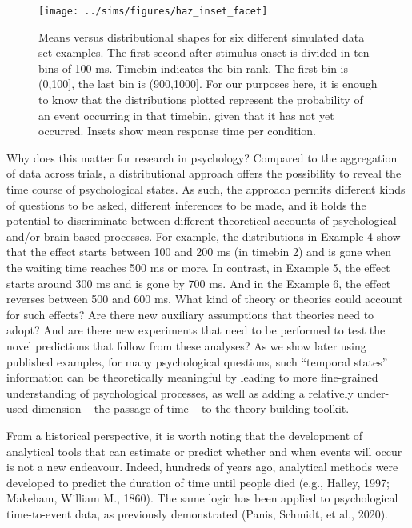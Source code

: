 \documentclass[
  man, donotrepeattitle,floatsintext]{apa6}
\begin{document}
\begin{figure}[H]

{\centering \texttt{[image: ../sims/figures/haz\_inset\_facet]} 

}

\caption{Means versus distributional shapes for six different simulated data set examples. The first second after stimulus onset is divided in ten bins of 100 ms. Timebin indicates the bin rank. The first bin is (0,100{]}, the last bin is (900,1000{]}. For our purposes here, it is enough to know that the distributions plotted represent the probability of an event occurring in that timebin, given that it has not yet occurred. Insets show mean response time per condition.}\label{fig:plot1}
\end{figure}

Why does this matter for research in psychology? Compared to the aggregation of data across trials, a distributional approach offers the possibility to reveal the time course of psychological states. As such, the approach permits different kinds of questions to be asked, different inferences to be made, and it holds the potential to discriminate between different theoretical accounts of psychological and/or brain-based processes.
For example, the distributions in Example 4 show that the effect starts between 100 and 200 ms (in timebin 2) and is gone when the waiting time reaches 500 ms or more. In contrast, in Example 5, the effect starts around 300 ms and is gone by 700 ms. And in the Example 6, the effect reverses between 500 and 600 ms. What kind of theory or theories could account for such effects? Are there new auxiliary assumptions that theories need to adopt? And are there new experiments that need to be performed to test the novel predictions that follow from these analyses? As we show later using published examples, for many psychological questions, such ``temporal states'' information can be theoretically meaningful by leading to more fine-grained understanding of psychological processes, as well as adding a relatively under-used dimension -- the passage of time -- to the theory building toolkit.

From a historical perspective, it is worth noting that the development of analytical tools that can estimate or predict whether and when events will occur is not a new endeavour.
Indeed, hundreds of years ago, analytical methods were developed to predict the duration of time until people died (e.g., Halley, 1997; Makeham, William M., 1860).
The same logic has been applied to psychological time-to-event data, as previously demonstrated (Panis, Schmidt, et al., 2020).
\end{document}
